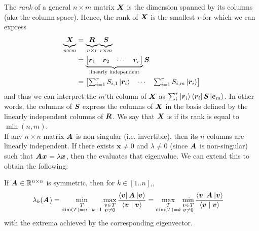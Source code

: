 \documentclass[11pt]{article}
\renewcommand\vec[2][]{\bm{#2}_{#1}}
\begin{document}
The \textit{rank} of a general $n \times m$ matrix $\bm{X}_{}$ is the dimension spanned by its columns (aka the column space). Hence, the rank of $\bm{X}_{}$ is the smallest $r$ for which we can express
\begin{align}
	\underbrace{\matr X}_{n \times m}
		&= \underbrace{\matr R}_{n \times r} \underbrace{\matr S}_{r \times m} \\
		&= \underbrace{ \begin{bmatrix}
			\vec[1]{r} & \vec[2]{r} & \cdots & \vec[r]{r} 
		\end{bmatrix} }_{\text{\scriptsize linearly independent}} \matr S \\
		&= \begin{bmatrix}
			\sum_{i=1}^{r} S_{i,1} \ket{\vec[i]{r}}
			& \cdots 
			& \sum_{i=1}^{r} S_{i,m} \ket{\vec[i]{r}}
		\end{bmatrix}
\end{align}
and thus we can interpret the $m$'th column of $\bm{X}_{}$ as $\sum_{i}^{r} \ket{\vec[i]{r}}\bra{\vec[i]{r}} \matr S \ket{\vec[m]{e}}$. In other words, the columns of $\bm{S}_{}$ express the columns of $\bm{X}_{}$ in the basis defined by the linearly independent columns of $\bm{R}_{}$. We say that $\bm{X}_{}$ is  if its rank is equal to $\min(n, m)$. \\

If any $n \times n$ matrix $\bm{A}_{}$ is non-singular (i.e. invertible), then its $n$ columns are linearly independent. If there exists $\vec x \neq 0$ and $\lambda \neq 0$ (since $\bm{A}_{}$ is non-singular) such that $\matr A \vec x = \lambda \vec x$, then the 
\graybox{
	\frac{\bra{\vec x } \matr A \ket{\vec x}}{\braket{\vec x \mid \vec x}} = \lambda 
} evaluates that eigenvalue. We can extend this to obtain the following:

\begin{definition}
	If $\bm{A}_{} \in \mathbb{R}^{n \times n}$ is symmetric, then for $k \in [1..n]$,,
	\begin{align}
		\lambda_k(\matr A)
			&= \min_{\substack{ T \\ \text{dim}(T) = n - k + 1}} \max_{\substack{\vec v \in T \\ \vec v \neq 0}} 
				\frac{\bra{\vec v } \matr A \ket{\vec v}}{\braket{\vec v \mid \vec v}} 
			= \max_{\substack{ T \\ \text{dim}(T) = k}} \min_{\substack{\vec v \in T \\ \vec v \neq 0}} 
				\frac{\bra{\vec v } \matr A \ket{\vec v}}{\braket{\vec v \mid \vec v}} 
	\end{align}
	with the extrema achieved by the corresponding eigenvector. 
\end{definition}
\end{document}
